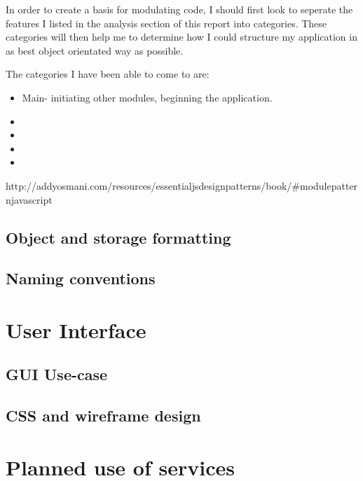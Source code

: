 In order to create a basis for modulating code, I should first look to seperate the features I listed in the analysis section of this report into categories. These categories will then help me to determine how I could structure my application in as best object orientated way as possible.

The categories I have been able to come to are:
\begin{itemize}
  \item Main- initiating other modules, beginning the application.
  \item
  \item
  \item
  \item
\end{itemize}
http://addyosmani.com/resources/essentialjsdesignpatterns/book/#modulepatternjavascript

\subsection{Object and storage formatting}

\subsection{Naming conventions}

\section{User Interface}

\subsection{GUI Use-case}

\subsection{CSS and wireframe design}

\section{Planned use of services}

